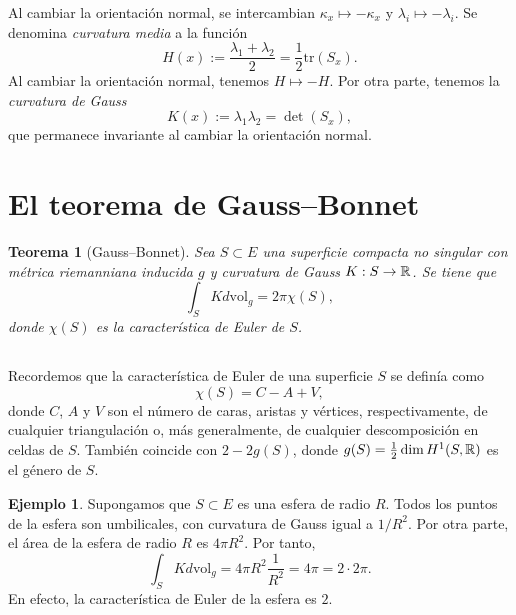 \documentclass[11pt,a4paper]{amsbook}
\newtheorem{thm}[subsection]{Teorema}
\theoremstyle{remark} \newtheorem{rmk}[subsection]{Observación}
\theoremstyle{definition} \newtheorem{defn}[subsection]{Definición}
\theoremstyle{definition} \newtheorem{ex}[subsection]{Ejemplo}
\theoremstyle{definition} \newtheorem{ej}[subsection]{Ejercicio}
\begin{document}
Al cambiar la orientación normal, se intercambian $\kappa_x \mapsto -\kappa_x$ y $\lambda_i\mapsto -\lambda_i$. Se denomina \emph{curvatura media} a la función
\begin{equation*}
H(x) := \frac{\lambda_1 + \lambda_2}{2} = \frac{1}{2} \mathrm{tr}(S_x).
\end{equation*}
Al cambiar la orientación normal, tenemos $H\mapsto -H$. Por otra parte, tenemos la \emph{curvatura de Gauss}
\begin{equation*}
K(x) := \lambda_1 \lambda_2 = \det(S_x),
\end{equation*}
que permanece invariante al cambiar la orientación normal.

\section{El teorema de Gauss--Bonnet}

\begin{thm}[Gauss--Bonnet]
  Sea $S\subset E$ una superficie compacta no singular con métrica riemanniana inducida $g$ y curvatura de Gauss $K:S\rightarrow \mathbb R$. Se tiene que
  \begin{equation*}
\int_S K d\mathrm{vol}_g = 2\pi \chi(S),
  \end{equation*}
  donde $\chi(S)$ es la característica de Euler de $S$.
\end{thm}

\subsection{} Recordemos que la característica de Euler de una superficie $S$ se definía como \[\chi(S)=C-A+V,\] donde $C$, $A$ y $V$ son el número de caras, aristas y vértices, respectivamente, de cualquier triangulación o, más generalmente, de cualquier descomposición en celdas de $S$. También coincide con $2-2g(S)$, donde $g(S)=\frac{1}{2}\dim H^1(S,\mathbb R)$ es el género de $S$.

\begin{ex}
  Supongamos que $S\subset E$ es una esfera de radio $R$. Todos los puntos de la esfera son umbilicales, con curvatura de Gauss igual a $1/R^2$. Por otra parte, el área de la esfera de radio $R$ es $4\pi R^2$. Por tanto,
  \begin{equation*}
\int_S K d\mathrm{vol}_g = 4\pi R^2 \frac{1}{R^2} = 4\pi = 2\cdot 2\pi.
  \end{equation*}
En efecto, la característica de Euler de la esfera es $2$.
\end{ex}
\end{document}
